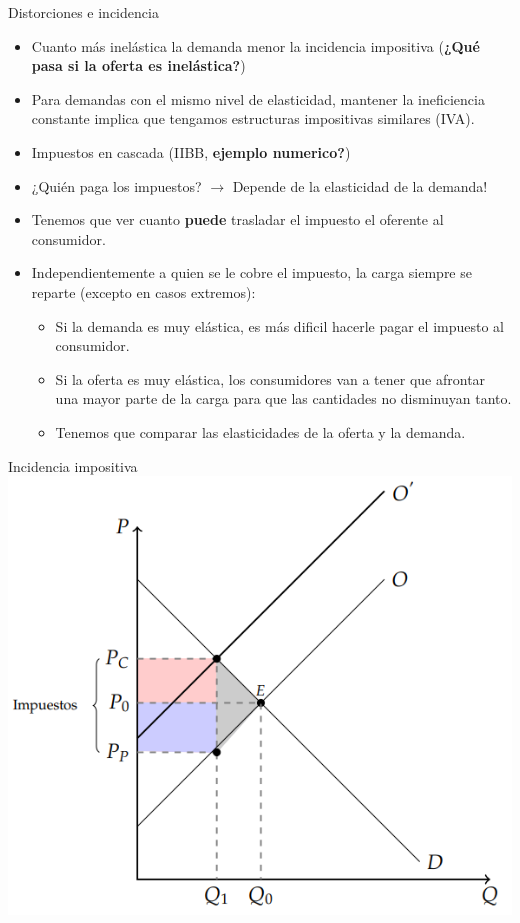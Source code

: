 \documentclass{beamer}
\begin{document}
\begin{frame}{Distorciones e incidencia}
    \begin{itemize}
        \item Cuanto más inelástica la demanda menor la incidencia impositiva (\textbf{¿Qué pasa si la oferta es inelástica?})
        \item Para demandas con el mismo nivel de elasticidad, mantener la ineficiencia constante implica que tengamos estructuras impositivas similares (IVA).
        \item Impuestos en cascada (IIBB, \textbf{ejemplo numerico?})
        \item ¿Quién paga los impuestos? $\rightarrow$ Depende de la elasticidad de la demanda!
        \item Tenemos que ver cuanto \textbf{puede} trasladar el impuesto el oferente al consumidor.
        \item Independientemente a quien se le cobre el impuesto, la carga siempre se reparte (excepto en casos extremos):
        \begin{itemize}
            \item Si la demanda es muy elástica, es más dificil hacerle pagar el impuesto al consumidor.
            \item Si la oferta es muy elástica, los consumidores van a tener que afrontar una mayor parte de la carga para que las cantidades no disminuyan tanto.
            \item Tenemos que comparar las elasticidades de la oferta y la demanda.
        \end{itemize}
    \end{itemize}
\end{frame}

\begin{frame}{Incidencia impositiva}
    \centering
    \includegraphics[scale=0.7]{../Figures/C24.4.png}
\end{frame}
\end{document}

